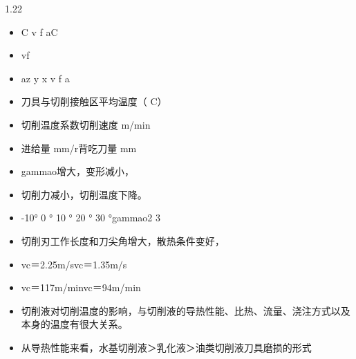 \documentclass[12pt,a4paper]{article}
\begin{document}
\begin{spacing}{1.22}
\begin{itemize}[leftmargin=2.2em,label=--]
  \item C v f aC
  \item vf
  \item az y x v f a
  \item 刀具与切削接触区平均温度（ C）
  \item 切削温度系数切削速度 m/min
  \item 进给量 mm/r背吃刀量 mm
  \item gammao增大，变形减小，
  \item 切削力减小，切削温度下降。
  \item -10° 0 ° 10 ° 20 ° 30 °gammao2 3
  \item 切削刃工作长度和刀尖角增大，散热条件变好，
  \item vc＝2.25m/svc＝1.35m/s
  \item vc＝117m/minvc＝94m/min
  \item 切削液对切削温度的影响，与切削液的导热性能、比热、流量、浇注方式以及本身的温度有很大关系。
  \item 从导热性能来看，水基切削液＞乳化液＞油类切削液刀具磨损的形式
\end{itemize}


\end{spacing}
\end{document}
